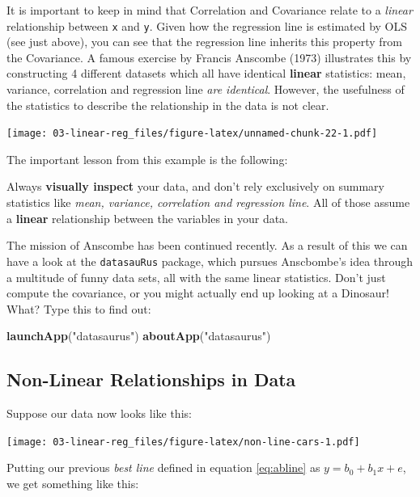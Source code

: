 \documentclass[]{book}
\newenvironment{Shaded}{\begin{snugshade}}{\end{snugshade}}
\newcommand{\KeywordTok}[1]{\textcolor[rgb]{0.13,0.29,0.53}{\textbf{#1}}}
\newcommand{\StringTok}[1]{\textcolor[rgb]{0.31,0.60,0.02}{#1}}
\newcommand{\NormalTok}[1]{#1}
\newenvironment{warning}{\begin{tcolorbox}[colback=orange!5!white,colframe=orange]}{\end{tcolorbox}}
\begin{document}
It is important to keep in mind that Correlation and Covariance relate
to a \emph{linear} relationship between \texttt{x} and \texttt{y}. Given
how the regression line is estimated by OLS (see just above), you can
see that the regression line inherits this property from the Covariance.
A famous exercise by Francis Anscombe (1973) illustrates this by
constructing 4 different datasets which all have identical
\textbf{linear} statistics: mean, variance, correlation and regression
line \emph{are identical}. However, the usefulness of the statistics to
describe the relationship in the data is not clear.

\texttt{[image: 03-linear-reg\_files/figure-latex/unnamed-chunk-22-1.pdf]}

The important lesson from this example is the following:

\begin{warning}
Always \textbf{visually inspect} your data, and don't rely exclusively
on summary statistics like \emph{mean, variance, correlation and
regression line}. All of those assume a \textbf{linear} relationship
between the variables in your data.
\end{warning}

 The mission of Anscombe has been continued recently. As a result of
this we can have a look at the \texttt{datasauRus} package, which
pursues Anscbombe's idea through a multitude of funny data sets, all
with the same linear statistics. Don't just compute the covariance, or
you might actually end up looking at a Dinosaur! What? Type this to find
out:

\begin{Shaded}
\begin{Highlighting}[]
\KeywordTok{launchApp}\NormalTok{(}\StringTok{"datasaurus"}\NormalTok{)}
\KeywordTok{aboutApp}\NormalTok{(}\StringTok{"datasaurus"}\NormalTok{)}
\end{Highlighting}
\end{Shaded}

\subsection{Non-Linear Relationships in
Data}\label{non-linear-relationships-in-data}

Suppose our data now looks like this:

\texttt{[image: 03-linear-reg\_files/figure-latex/non-line-cars-1.pdf]}

Putting our previous \emph{best line} defined in equation
\eqref{eq:abline} as \(y = b_0 + b_1 x + e\), we get something like this:
\end{document}
